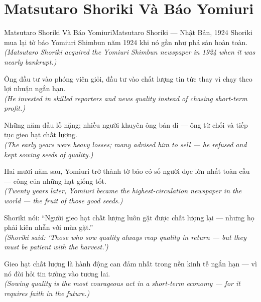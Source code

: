 \section{Matsutaro Shoriki Và Báo Yomiuri}
\begin{truyen}{Matsutaro Shoriki Và Báo Yomiuri}{Matsutaro Shoriki --- Nhật Bản, 1924}
 Shoriki mua lại tờ báo Yomiuri Shimbun năm 1924 khi nó gần như phá sản hoàn toàn.\\[4pt]
\textit{(Matsutaro Shoriki acquired the Yomiuri Shimbun newspaper in 1924 when it was nearly bankrupt.)}

Ông đầu tư vào phóng viên giỏi, đầu tư vào chất lượng tin tức thay vì chạy theo lợi nhuận ngắn hạn.\\[4pt]
\textit{(He invested in skilled reporters and news quality instead of chasing short-term profit.)}

Những năm đầu lỗ nặng; nhiều người khuyên ông bán đi --- ông từ chối và tiếp tục gieo hạt chất lượng.\\[4pt]
\textit{(The early years were heavy losses; many advised him to sell --- he refused and kept sowing seeds of quality.)}

Hai mươi năm sau, Yomiuri trở thành tờ báo có số người đọc lớn nhất toàn cầu --- công của những hạt giống tốt.\\[4pt]
\textit{(Twenty years later, Yomiuri became the highest-circulation newspaper in the world --- the fruit of those good seeds.)}

Shoriki nói: ``Người gieo hạt chất lượng luôn gặt được chất lượng lại --- nhưng họ phải kiên nhẫn với mùa gặt.''\\[4pt]
\textit{(Shoriki said: `Those who sow quality always reap quality in return --- but they must be patient with the harvest.')}

\end{truyen}
\begin{baihoc}
  Gieo hạt chất lượng là hành động can đảm nhất trong nền kinh tế ngắn hạn --- vì nó đòi hỏi tin tưởng vào tương lai.\\[4pt]
  \textit{(Sowing quality is the most courageous act in a short-term economy --- for it requires faith in the future.)}
\end{baihoc}

